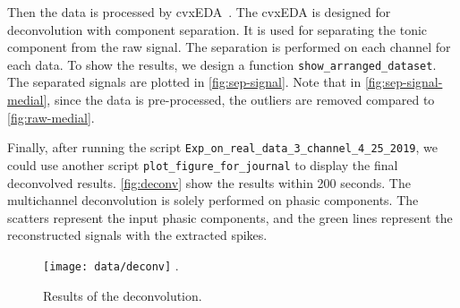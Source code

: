 \documentclass[]{article}
\begin{document}
Then the data is processed by cvxEDA~\cite{greco2015cvxeda}. The cvxEDA is designed for deconvolution with component separation. It is used for separating the tonic component from the raw signal. The separation is performed on each channel for each data. To show the results, we design a function \texttt{show\_arranged\_dataset}. The separated signals are plotted in \autoref{fig:sep-signal}. Note that in \autoref{fig:sep-signal-medial}, since the data is pre-processed, the outliers are removed compared to \autoref{fig:raw-medial}.

Finally, after running the script \texttt{Exp\_on\_real\_data\_3\_channel\_4\_25\_2019}, we could use another script \texttt{plot\_figure\_for\_journal} to display the final deconvolved results. \autoref{fig:deconv} show the results within 200 seconds. The multichannel deconvolution is solely performed on phasic components. The scatters represent the input phasic components, and the green lines represent the reconstructed signals with the extracted spikes.

\begin{figure}[htbp]
  \centering
  \texttt{[image: data/deconv]}
  \DeclareGraphicsExtensions.
  \caption{Results of the deconvolution.} \label{fig:deconv}
\end{figure}



\end{document}
